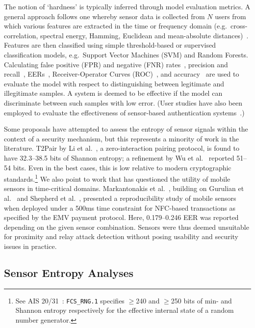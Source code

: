 The notion of `hardness' is typically inferred through model evaluation metrics. A general approach follows one whereby sensor data is collected from $N$ users from which various features are extracted in the time or frequency domain (e.g.\ cross-correlation, spectral energy, Hamming, Euclidean and mean-absolute distances)~\cite{markantonakis2024using,mehrnezhad2015tap,shrestha2018sensor,shrestha2014drone}. Features are then classified using simple threshold-based or supervised classification models, e.g.\ Support Vector Machines (SVM) and Random Forests. Calculating false positive (FPR) and negative (FNR) rates~\cite{mayrhofer2009shake}, precision and recall~\cite{riva2012progressive}, EERs~\cite{gurulian2018good,mehrnezhad2015tap}, Receiver-Operator Curves (ROC)~\cite{li2013unobservable}, and accuracy~\cite{li2013unobservable} are used to evaluate the model with respect to  distinguishing between legitimate and illegitimate samples. A system is deemed to be effective if the model can discriminate between such samples with low error. (User studies have also been employed to evaluate the effectiveness of sensor-based authentication systems~\cite{hayashi2013casa,mayrhofer2009shake}.) 

Some proposals have attempted to assess the entropy of sensor signals within the context of a security mechanism, but this represents a minority of work in the literature. T2Pair by Li et al.~\cite{li2020t2pair}, a zero-interaction pairing protocol, is found to have 32.3--38.5 bits of Shannon entropy; a refinement by Wu et al.~\cite{wu2024t2pair} reported 51--54 bits. Even in the best cases, this is low relative to modern cryptographic standards.\footnote{See AIS 20/31~\cite{bsi2024ais31}: \texttt{FCS\_RNG.1} specifies $\geq$240 and $\geq$250 bits of min- and Shannon entropy respectively for the effective internal state of a random number generator.} We also point to work that has questioned the utility of mobile sensors in time-critical domains. Markantonakis et al.~\cite{markantonakis2024using}, building on Gurulian et al.~\cite{gurulian2017effectiveness} and Shepherd et al.~\cite{shepherd2017applicability}, presented a reproducibility study of mobile sensors when deployed under a 500ms time constraint for NFC-based transactions as specified by the EMV payment protocol. Here, 0.179--0.246 EER was reported depending on the given sensor combination. Sensors were thus deemed unsuitable for proximity and relay attack detection without posing usability and security issues in practice. 

\subsection{Sensor Entropy Analyses}


